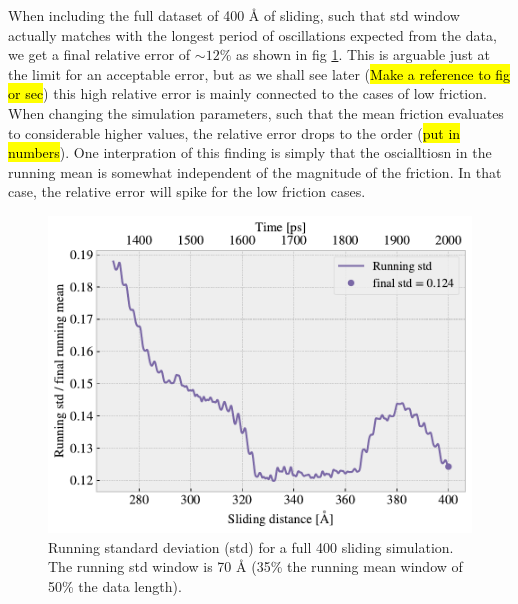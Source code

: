 When including the full dataset of 400 Å of sliding, such that std window actually matches with the longest period of oscillations expected from the data, we get a final relative error of $\sim 12 \%$ as shown in fig \cref{fig:runstd_long}. This is arguable just at the limit for an acceptable error, but as we shall see later (\hl{Make a reference to fig or sec}) this high relative error is mainly connected to the cases of low friction. When changing the simulation parameters, such that the mean friction evaluates to considerable higher values, the relative error drops to the order (\hl{put in numbers}). One interpration of this finding is simply that the oscialltiosn in the running mean is somewhat independent of the magnitude of the friction. In that case, the relative error will spike for the low friction cases. 


\begin{figure}[H]
  \centering
  \includegraphics[width=0.6\linewidth]{figures/baseline/Ff_runstd_long.pdf}
  \caption{Running standard deviation (std) for a full \SI{400}{{}} sliding simulation. The running std window is 70 Å (35\% the running mean window of 50\% the data length).}
  \label{fig:runstd_long}
\end{figure}


